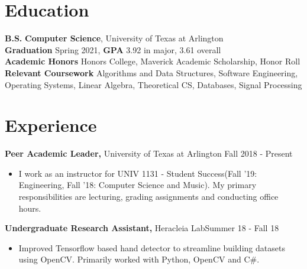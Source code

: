 \documentclass[margin]{res}
\begin{document}
 
 
 
\address{{\bf Present Address} \\ 402 Kerby Street \\ Arlington, TX 76013  \\
        (682) 551-2698 }
\address{{\bf Email}  adarsh9pai@gmail.com\\{\bf GitHub} github.com/adarsh9pai \\
        {\bf Website} www.adarshpai.com }

 
\begin{resume} 

\section{Education} 
{\bf B.S.} {\bf Computer Science}, University of Texas at Arlington\\
{\bf Graduation} Spring 2021, {\bf GPA} 3.92 in major, 3.61 overall \\
{\bf Academic Honors} Honors College, Maverick Academic Scholarship, Honor Roll\\
{\bf Relevant Coursework} Algorithms and Data Structures, Software Engineering, Operating Systems, Linear Algebra, Theoretical CS, Databases, Signal Processing\\
 

\section{Experience}

{\bf Peer Academic Leader,} University of Texas at Arlington \hfill  Fall 2018 - Present
\begin{itemize} \itemsep -2pt %
\item I work as an instructor for UNIV 1131 - Student Success(Fall '19: Engineering, Fall '18: Computer Science and Music). My primary responsibilities are lecturing, grading assignments and conducting office hours.
\end{itemize}

 {\bf Undergraduate Research Assistant,} Heracleia Lab\hfill Summer 18 - Fall 18
 \begin{itemize} \itemsep -2pt  %
 \item Improved Tensorflow based hand detector to streamline building datasets using OpenCV. Primarily worked with Python, OpenCV and C\#.
 \end{itemize}
  

\end{resume}
\end{document}
